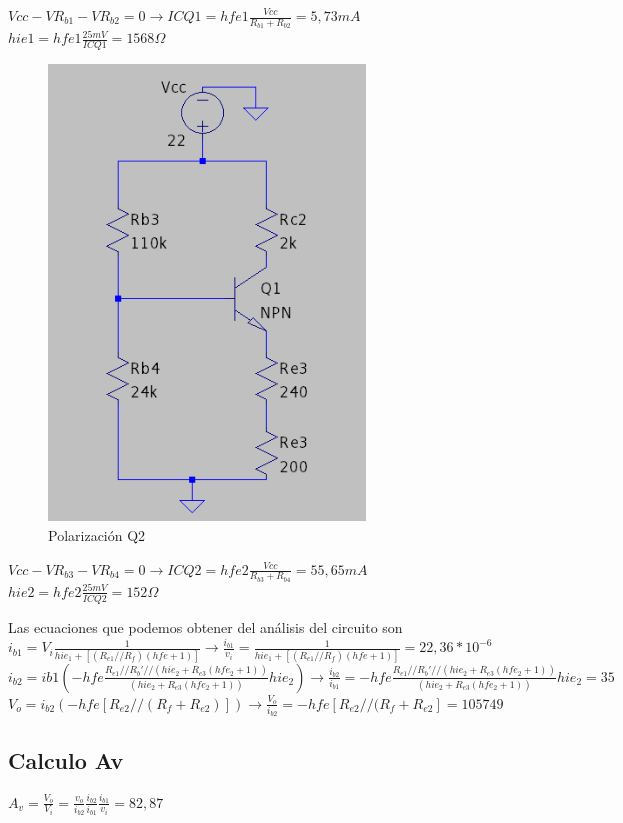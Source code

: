 \documentclass[12pt, letterpaper]{article}
\begin{document}
$Vcc-VR_{b1}-VR_{b2}=0 \rightarrow ICQ1=hfe1\frac{Vcc}{R_{b1}+R_{b2}}=5,73mA$
\singlespacing
$hie1=hfe1\frac{25mV}{ICQ1}=1568\Omega$
\begin{figure}[H]
	\centering
	\includegraphics[width=0.75\textwidth]{Imagenes/PolarizaQ2.png}
	\caption{Polarización Q2}
	\label{fig:pol_Q2}
\end{figure}
$Vcc-VR_{b3}-VR_{b4}=0 \rightarrow ICQ2=hfe2\frac{Vcc}{R_{b3}+R_{b4}}=55,65mA$
\singlespacing
$hie2=hfe2\frac{25mV}{ICQ2}=152\Omega$
\singlespacing

Las ecuaciones que podemos obtener del análisis del circuito son
\singlespacing
$i_{b1}=V_i\frac{1}{hie_1+[(R_{e1}//R_f)(hfe + 1)]} \rightarrow \frac{i_{b1}}{v_i}=\frac{1}{hie_1+[(R_{e1}//R_f)(hfe + 1)]}=22,36*10^{-6}$
\singlespacing
$ i_{b2}=ib1(-hfe\frac{R_{e1}//R_b'//(hie_2+R_{e3}(hfe_2+1))}{(hie_2+R_{e3}(hfe_2+1))}{hie_2}) \rightarrow \frac{i_{b2}}{i_{b1}}=-hfe\frac{R_{e1}//R_b'//(hie_2+R_{e3}(hfe_2+1))}{(hie_2+R_{e3}(hfe_2+1))}{hie_2}=35$
\singlespacing
$V_o=i_{b2}(-hfe[R_{e2}//(R_f+R_{e2})]) \rightarrow \frac{V_o}{i_{b2}}=-hfe[R_{e2}//(R_f+R_{e2}]=105749$
\subsection{Calculo Av}
$A_v=\frac{V_o}{V_i}=\frac{v_o}{i_{b2}}\frac{i_{b2}}{i_{b1}}\frac{i_{b1}}{v_i}=82,87$
\end{document}
